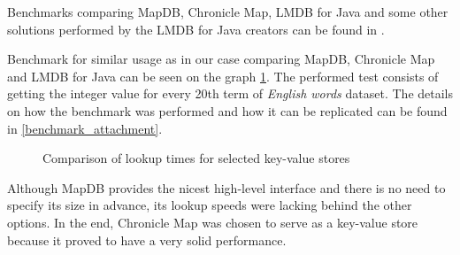 Benchmarks comparing MapDB, Chronicle Map, LMDB for Java and some other solutions performed by the LMDB for Java creators
can be found in \citep{lmdb}.

Benchmark for similar usage as in our case comparing MapDB, Chronicle Map and LMDB for Java can be seen on the graph \ref{comp_maps}.
The performed test consists of getting the integer value for every 20th term of \textit{English words} dataset.
The details on how the benchmark was performed and how it can be replicated can be found in \ref{benchmark_attachment}.

\begin{figure}[htbp]
    \centering
    \caption{Comparison of lookup times for selected key-value stores}
    \label{comp_maps}
\end{figure}

Although MapDB provides the nicest high-level interface and there is no need to specify its size in advance,
its lookup speeds were lacking behind the other options.
In the end, Chronicle Map was chosen to serve as a key-value store because it proved to have a very solid performance.

